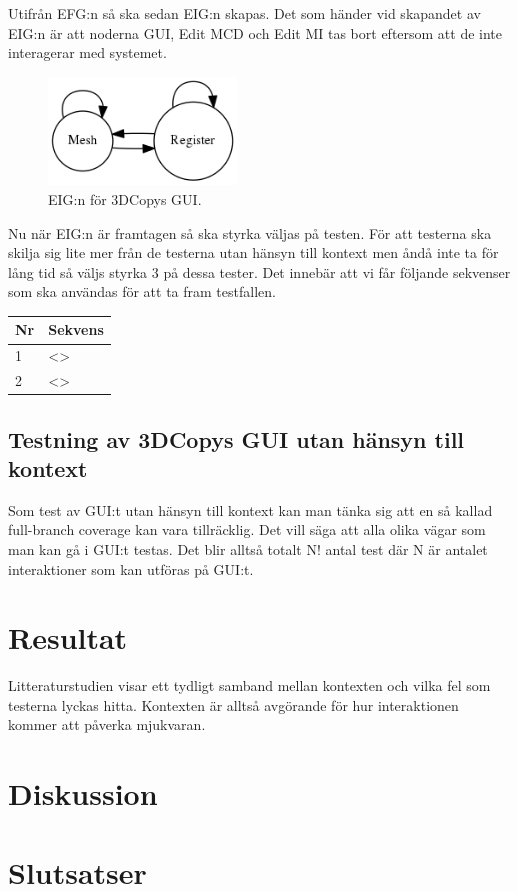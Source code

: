Utifrån EFG:n så ska sedan EIG:n skapas. Det som händer vid skapandet av EIG:n är att noderna GUI, Edit MCD och Edit MI tas bort eftersom att de inte interagerar med systemet.

\begin{figure}[H]
	\centering
	\includegraphics[width=50mm]{figures/3DCopyGUIEIG.png}
	\caption{EIG:n för 3DCopys GUI.}
	\label{fig:3dcopy_guieig}
\end{figure}

Nu när EIG:n är framtagen så ska styrka väljas på testen. För att testerna ska skilja sig lite mer från de testerna utan hänsyn till kontext men åndå inte ta för lång tid så väljs styrka 3 på dessa tester. Det innebär att vi får följande sekvenser som ska användas för att ta fram testfallen.

\begin{tabular}{|l|l|}
	\hline
	\textbf{Nr} & \textbf{Sekvens} \\
	\hline
	1 & <> \\
	\hline
	2 & <> \\
	\hline
\end{tabular}

\subsection{Testning av 3DCopys GUI utan hänsyn till kontext}

Som test av GUI:t utan hänsyn till kontext kan man tänka sig att en så kallad full-branch coverage kan vara tillräcklig. Det vill säga att alla olika vägar som man kan gå i GUI:t testas. Det blir alltså totalt N! antal test där N är antalet interaktioner som kan utföras på GUI:t.

\section{Resultat}
\label{sec:results-holmberg}

Litteraturstudien visar ett tydligt samband mellan kontexten och vilka fel som testerna lyckas hitta. Kontexten är alltså avgörande för hur interaktionen kommer att påverka mjukvaran.

\section{Diskussion}
\label{sec:discussion-holmberg}


\section{Slutsatser}
\label{sec:conclusions-holmberg}



